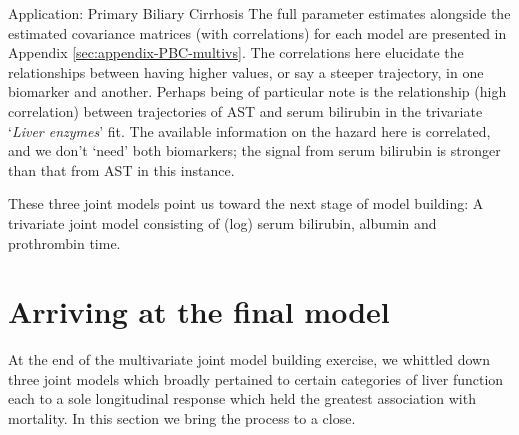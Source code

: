\begin{chapter}{\label{cha:app-PBC}Application: Primary Biliary Cirrhosis}
  The full parameter estimates alongside the estimated covariance matrices (with correlations) for each model are presented in Appendix \ref{sec:appendix-PBC-multivs}. The correlations here elucidate the relationships between \eg having higher values, or say a steeper trajectory, in one biomarker and another. Perhaps being of particular note is the relationship (\ie high correlation) between trajectories of AST and serum bilirubin in the trivariate `\textit{Liver enzymes}' fit. The available information on the hazard here is correlated, and we don't `need' both biomarkers; the signal from serum bilirubin is stronger than that from AST in this instance.

  These three joint models point us toward the next stage of model building: A trivariate joint model consisting of (log) serum bilirubin, albumin and prothrombin time.
    
  \resettocmain
  \section{Arriving at the final model}\label{sec:pbc-finalmodel}
  At the end of the multivariate joint model building exercise, we whittled down three joint models which broadly pertained to certain categories of liver function each to a sole longitudinal response which held the greatest association with mortality. In this section we bring the process to a close.


\end{chapter}

